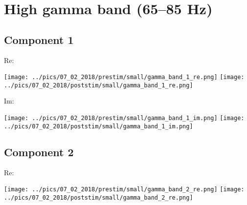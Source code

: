 \documentclass{article}
\begin{document}

\section{High gamma band (65--85 Hz)}
\subsection*{Component 1}
Re:

\hspace{2cm}
\texttt{[image: ../pics/07\_02\_2018/prestim/small/gamma\_band\_1\_re.png]}
\hspace{2cm}
\texttt{[image: ../pics/07\_02\_2018/poststim/small/gamma\_band\_1\_re.png]}

Im:

\hspace{2cm}
\texttt{[image: ../pics/07\_02\_2018/prestim/small/gamma\_band\_1\_im.png]}
\hspace{2cm}
\texttt{[image: ../pics/07\_02\_2018/poststim/small/gamma\_band\_1\_im.png]}

\subsection*{Component 2}
Re:

\hspace{2cm}
\texttt{[image: ../pics/07\_02\_2018/prestim/small/gamma\_band\_2\_re.png]}
\hspace{2cm}
\texttt{[image: ../pics/07\_02\_2018/poststim/small/gamma\_band\_2\_re.png]}
\end{document}
